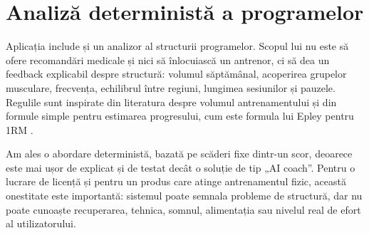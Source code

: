 \section{Analiză deterministă a programelor}

Aplicația include și un analizor al structurii programelor. Scopul lui nu este să ofere recomandări
medicale și nici să înlocuiască un antrenor, ci să dea un feedback explicabil despre structură:
volumul săptămânal, acoperirea grupelor musculare, frecvența, echilibrul între regiuni, lungimea
sesiunilor și pauzele. Regulile sunt inspirate din literatura despre volumul antrenamentului
\cite{schoenfeld2017dose} și din formule simple pentru estimarea progresului, cum este formula lui
Epley pentru 1RM \cite{epley1985}.

Am ales o abordare deterministă, bazată pe scăderi fixe dintr-un scor, deoarece este mai ușor de
explicat și de testat decât o soluție de tip „AI coach”. Pentru o lucrare de licență și pentru un
produs care atinge antrenamentul fizic, această onestitate este importantă: sistemul poate semnala
probleme de structură, dar nu poate cunoaște recuperarea, tehnica, somnul, alimentația sau nivelul
real de efort al utilizatorului.

